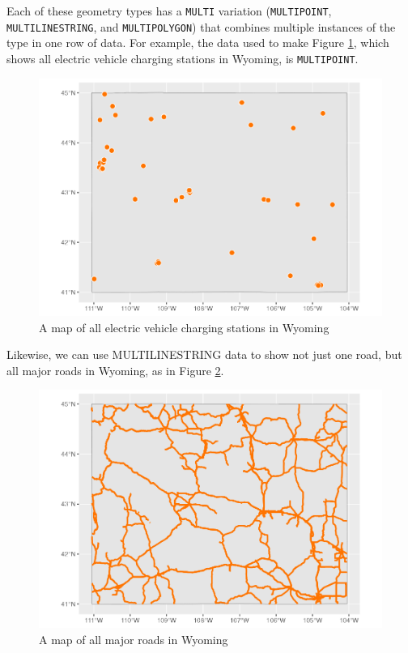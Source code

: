 \documentclass[
]{book}
\begin{document}
Each of these geometry types has a \texttt{MULTI} variation (\texttt{MULTIPOINT}, \texttt{MULTILINESTRING}, and \texttt{MULTIPOLYGON}) that combines multiple instances of the type in one row of data. For example, the data used to make Figure \ref{fig:wyoming-ev-stations-map}, which shows all electric vehicle charging stations in Wyoming, is \texttt{MULTIPOINT}.

\begin{figure}
\includegraphics[width=1\linewidth]{maps_files/figure-latex/wyoming-ev-stations-map-1} \caption{A map of all electric vehicle charging stations in Wyoming}\label{fig:wyoming-ev-stations-map}
\end{figure}

Likewise, we can use MULTILINESTRING data to show not just one road, but all major roads in Wyoming, as in Figure \ref{fig:wyoming-roads-map}.

\begin{figure}
\includegraphics[width=1\linewidth]{maps_files/figure-latex/wyoming-roads-map-1} \caption{A map of all major roads in Wyoming}\label{fig:wyoming-roads-map}
\end{figure}
\end{document}
